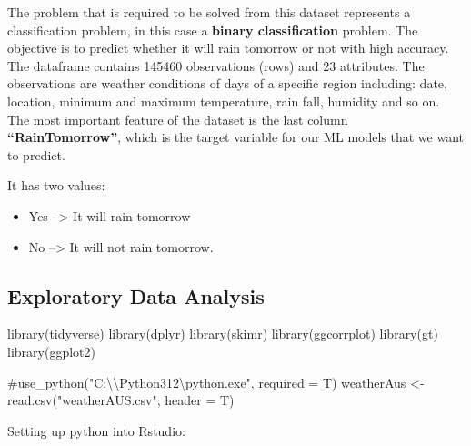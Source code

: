 \documentclass[
  letterpaper,
  DIV=11,
  numbers=noendperiod]{scrartcl}
\newenvironment{Shaded}{\begin{snugshade}}{\end{snugshade}}
\newcommand{\AttributeTok}[1]{\textcolor[rgb]{0.40,0.45,0.13}{#1}}
\newcommand{\CommentTok}[1]{\textcolor[rgb]{0.37,0.37,0.37}{#1}}
\newcommand{\FunctionTok}[1]{\textcolor[rgb]{0.28,0.35,0.67}{#1}}
\newcommand{\NormalTok}[1]{\textcolor[rgb]{0.00,0.23,0.31}{#1}}
\newcommand{\OtherTok}[1]{\textcolor[rgb]{0.00,0.23,0.31}{#1}}
\newcommand{\StringTok}[1]{\textcolor[rgb]{0.13,0.47,0.30}{#1}}
\begin{document}
The problem that is required to be solved from this dataset represents a
classification problem, in this case a \textbf{binary classification}
problem. The objective is to predict whether it will rain tomorrow or
not with high accuracy. The dataframe contains 145460 observations
(rows) and 23 attributes. The observations are weather conditions of
days of a specific region including: date, location, minimum and maximum
temperature, rain fall, humidity and so on.\\

The most important feature of the dataset is the last column
\textbf{``RainTomorrow''}, which is the target variable for our ML
models that we want to predict.

It has two values:

\begin{itemize}
\item
  Yes --\textgreater{} It will rain tomorrow
\item
  No --\textgreater{} It will not rain tomorrow.
\end{itemize}

\hypertarget{exploratory-data-analysis}{%
\subsection{Exploratory Data Analysis}\label{exploratory-data-analysis}}

\begin{Shaded}
\begin{Highlighting}[]
\FunctionTok{library}\NormalTok{(tidyverse)}
\FunctionTok{library}\NormalTok{(dplyr)}
\FunctionTok{library}\NormalTok{(skimr)}
\FunctionTok{library}\NormalTok{(ggcorrplot)}
\FunctionTok{library}\NormalTok{(gt)}
\FunctionTok{library}\NormalTok{(ggplot2)}

\CommentTok{\#use\_python("C:\textbackslash{}\textbackslash{}Python312\textbackslash{}python.exe", required = T)}
\NormalTok{weatherAus }\OtherTok{\textless{}{-}} \FunctionTok{read.csv}\NormalTok{(}\StringTok{"weatherAUS.csv"}\NormalTok{, }\AttributeTok{header =}\NormalTok{ T)}
\end{Highlighting}
\end{Shaded}

Setting up python into Rstudio:
\end{document}
